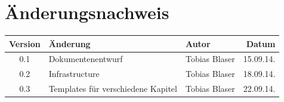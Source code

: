 \documentclass[ngerman,a4paper,12pt]{scrreprt}
\providecommand{\versionnumber}{0.3}
\begin{document}
%
%
%

\chapter*{Änderungsnachweis}
\begin{tabularx}{\textwidth}{|cXlr|} %
		\hline
		\textbf{Version} & \textbf{Änderung} & \textbf{Autor} & \textbf{Datum}\\
		\hline
		0.1 & Dokumentenentwurf & Tobias Blaser & 15.09.14.\\
		0.2 & Infrastructure & Tobias Blaser & 18.09.14.\\
		\versionnumber & Templates für verschiedene Kapitel & Tobias Blaser & 22.09.14.\\
		\hline
\end{tabularx}

\tableofcontents


%
%
%










%


%
%
%



{}

\listoffigures







%

%

%	
\end{document}
